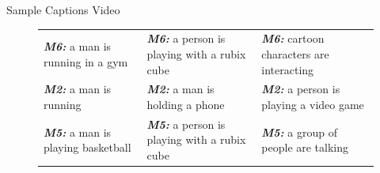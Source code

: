 \documentclass{beamer}
\begin{document}
\begin{frame}{Sample Captions Video}
\begin{figure}[thp]
\begin{center}
{\begin{tabular}{|l|l|l|}
    \textbf{\scriptsize\em M6:} \scriptsize a man is running in a gym &
    \textbf{\scriptsize\em M6:} \scriptsize a person is playing with a rubix cube &
    \textbf{\scriptsize\em M6:} \scriptsize cartoon characters are interacting\\
    \textbf{\scriptsize\em M2:} \scriptsize a man is running&
    \textbf{\scriptsize\em M2:} \scriptsize a man is holding a phone&
    \textbf{\scriptsize\em M2:} \scriptsize a person is playing a video game\\
    \textbf{\scriptsize\em M5:} \scriptsize a man is playing basketball&
    \textbf{\scriptsize\em M5:} \scriptsize a person is playing with a rubix cube &
    \textbf{\scriptsize\em M5:} \scriptsize a group of people are talking\\
    \hline
  \end{tabular}
  }
  \end{center}
  \label{fig:VttcapSamps}
\end{figure}
\end{frame}
\end{document}
